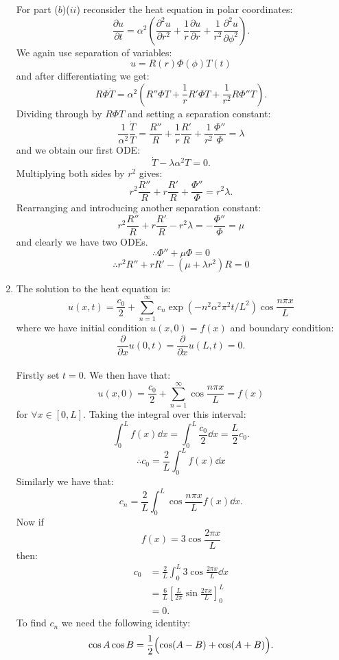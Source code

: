 \begin{enumerate}
    For part ($b$)($ii$) reconsider the heat equation
    in polar coordinates:
    $$\frac{\partial u}{\partial t}=\alpha^2\left(\frac{\partial^2 u}{\partial r^2}
    +\frac{1}{r}\frac{\partial u}{\partial r}
    +\frac{1}{r^2}\frac{\partial^2 u}{\partial \phi^2}\right).$$
    We again use separation of variables:
    $$u=R(r)\Phi(\phi)T(t)$$
    and after differentiating we get:
    $$R\Phi\dot{T}=\alpha^2\left(R''\Phi T+\frac{1}{r}R'\Phi T
    +\frac{1}{r^2}R\Phi''T\right).$$
    Dividing through by $R\Phi T$ and setting a separation constant:
    $$\frac{1}{\alpha^2}\frac{\dot{T}}{T}=\frac{R''}{R}+\frac{1}{r}\frac{R'}{R}
    +\frac{1}{r^2}\frac{\Phi''}{\Phi}=\lambda$$
    and we obtain our first ODE:
    $$\dot{T}-\lambda\alpha^2 T=0.$$
    Multiplying both sides by $r^2$ gives:
    $$r^2\frac{R''}{R}+r\frac{R'}{R}
    +\frac{\Phi''}{\Phi}=r^2\lambda.$$
    Rearranging and introducing another separation constant:
    $$r^2\frac{R''}{R}+r\frac{R'}{R}-r^2\lambda
    =-\frac{\Phi''}{\Phi}=\mu$$
    and clearly we have two ODEs.
    $$\therefore\Phi''+\mu\Phi=0$$
    $$\therefore r^2 R''+rR'
    -(\mu+\lambda r^2)R=0$$

    \newpage

    \item The solution to the heat equation is:
    $$u(x,t)=\frac{c_0}{2}+\sum_{n=1}^{\infty}c_n
    \exp\left(-n^2\alpha^2\pi^2 t/L^2\right)\cos\frac{n\pi x}{L}$$
    where we have initial condition $u(x,0)=f(x)$ and boundary condition:
    $$\frac{\partial}{\partial x}u(0,t)=\frac{\partial}{\partial x}u(L,t)=0.$$ \\

    Firstly set $t=0$. We then have that:
    $$u(x,0)=\frac{c_0}{2}+\sum_{n=1}^{\infty}\cos\frac{n\pi x}{L}=f(x)$$
    for $\forall x\in[0,L]$. Taking the integral over this interval:
    $$\int_{0}^{L}f(x)\dd x=\int_{0}^{L}\frac{c_0}{2}\dd x=\frac{L}{2}c_0.$$
    $$\therefore c_0=\frac{2}{L}\int_{0}^{L}f(x)\dd x$$
    Similarly we have that:
    $$c_n=\frac{2}{L}\int_{0}^{L}\cos\frac{n\pi x}{L}f(x)\dd x.$$
    Now if
    $$f(x)=3\cos\frac{2\pi x}{L}$$
    then:
    \begin{align*}
        c_0
        &=\frac{2}{L}\int_{0}^{L}3\cos\frac{2\pi x}{L}\dd x \\
        &=\frac{6}{L}\left[\frac{L}{2\pi}
        \sin\frac{2\pi x}{L}\right]_{0}^{L} \\
        &=0.
    \end{align*}
    To find $c_n$ we need the following identity:
    $$\cos A\cos B=\frac{1}{2}\Bigl(\cos(A-B)+\cos(A+B)\Bigl).$$


\end{enumerate}
